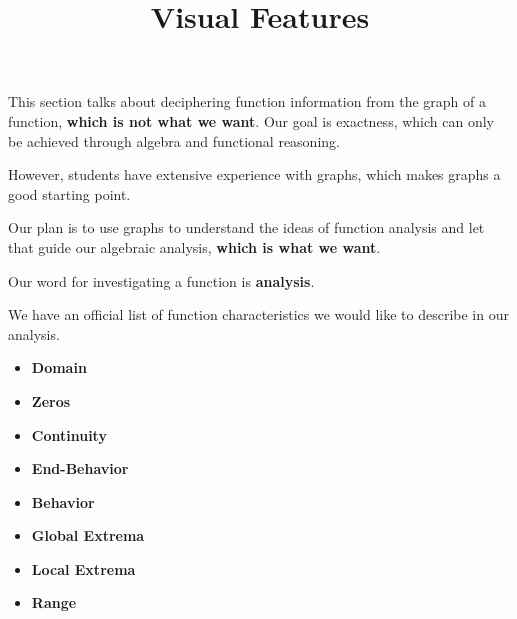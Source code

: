 \documentclass{ximera}
\title{Visual Features}
\begin{document}
\begin{abstract}
\end{abstract}
\maketitle






\begin{warning}


This section talks about deciphering function information from the graph of a function, \textbf{\textcolor{red!80!black}{which is not what we want}}.  Our goal is exactness, which can only be achieved through algebra and functional reasoning.

However, students have extensive experience with graphs, which makes graphs a good starting point. 

Our plan is to use graphs to understand the ideas of function analysis and let that guide our algebraic analysis, \textbf{\textcolor{red!80!black}{which is what we want}}.

\end{warning}





Our word for investigating a function is \textbf{\textcolor{blue!55!black}{analysis}}. 

We have an official list of function characteristics we would like to describe in our analysis. 






\begin{itemize}
\item \textbf{\textcolor{blue!55!black}{Domain}}
\item \textbf{\textcolor{blue!55!black}{Zeros}}
\item \textbf{\textcolor{blue!55!black}{Continuity}}
\item \textbf{\textcolor{blue!55!black}{End-Behavior}}
\item \textbf{\textcolor{blue!55!black}{Behavior}}
\item \textbf{\textcolor{blue!55!black}{Global Extrema}}
\item \textbf{\textcolor{blue!55!black}{Local Extrema}}
\item \textbf{\textcolor{blue!55!black}{Range}}
\end{itemize}
\end{document}
